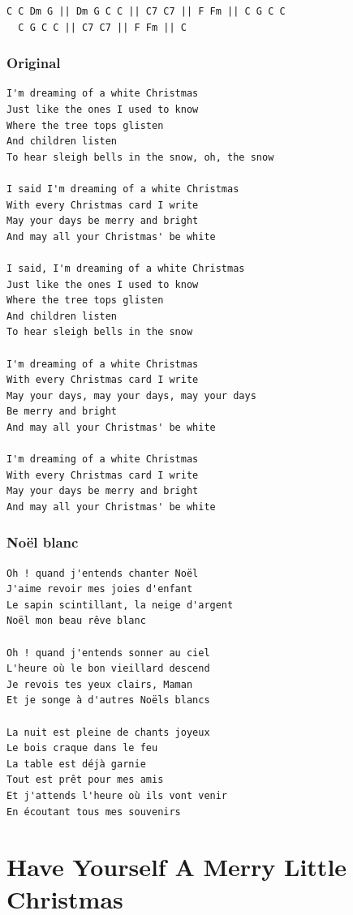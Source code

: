 \documentclass[
]{article}
\begin{document}
\begin{verbatim}
C C Dm G || Dm G C C || C7 C7 || F Fm || C G C C
  C G C C || C7 C7 || F Fm || C 
\end{verbatim}

\hypertarget{original-2}{%
\subsubsection{Original}\label{original-2}}

\begin{verbatim}
I'm dreaming of a white Christmas
Just like the ones I used to know
Where the tree tops glisten
And children listen
To hear sleigh bells in the snow, oh, the snow

I said I'm dreaming of a white Christmas
With every Christmas card I write
May your days be merry and bright
And may all your Christmas' be white

I said, I'm dreaming of a white Christmas
Just like the ones I used to know
Where the tree tops glisten
And children listen
To hear sleigh bells in the snow

I'm dreaming of a white Christmas
With every Christmas card I write
May your days, may your days, may your days
Be merry and bright
And may all your Christmas' be white

I'm dreaming of a white Christmas
With every Christmas card I write
May your days be merry and bright
And may all your Christmas' be white
\end{verbatim}

\hypertarget{nouxebl-blanc}{%
\subsubsection{Noël blanc}\label{nouxebl-blanc}}

\begin{verbatim}
Oh ! quand j'entends chanter Noël
J'aime revoir mes joies d'enfant 
Le sapin scintillant, la neige d'argent 
Noël mon beau rêve blanc

Oh ! quand j'entends sonner au ciel 
L'heure où le bon vieillard descend 
Je revois tes yeux clairs, Maman 
Et je songe à d'autres Noëls blancs

La nuit est pleine de chants joyeux 
Le bois craque dans le feu 
La table est déjà garnie 
Tout est prêt pour mes amis 
Et j'attends l'heure où ils vont venir 
En écoutant tous mes souvenirs
\end{verbatim}

\hypertarget{have-yourself-a-merry-little-christmas}{%
\section{Have Yourself A Merry Little
Christmas}\label{have-yourself-a-merry-little-christmas}}
\end{document}
